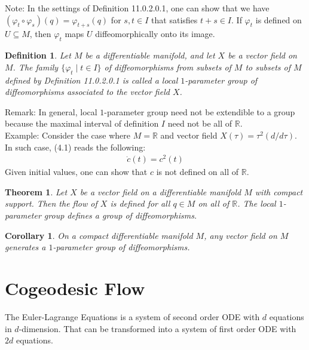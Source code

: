 \documentclass[11pt]{book}
\theoremstyle{break}
\theoremstyle{break}
\newtheorem{thm}{Theorem}[section]
\newtheorem{corT}[lem]{Corollary}
\newtheorem{defn}{Definition}[corL]
\newcommand{\R}{\mathbb{R}}
\newcommand{\note}{\color{red}Note: \color{black}}
\newcommand{\remark}{\color{blue}Remark: \color{black}}
\newcommand{\example}{\color{green}Example: \color{black}}
\begin{document}
\note In the settings of Definition 11.0.2.0.1, one can show that we have $(\varphi_{t}\circ \varphi_s) (q) = \varphi_{t+s}(q)$ for $s,t\in I$ that satisfies $t+s\in I$. If $\varphi_t$ is defined on $U \subseteq M$, then $\varphi_t$ maps $U$ diffeomorphically onto its image. \\

\begin{defn}
Let $M$ be a differentiable manifold, and let $X$ be a vector field on $M$. The family $\{\varphi_t \mid t \in I\}$ of diffeomorphisms from subsets of $M$ to subsets of $M$ defined by Definition 11.0.2.0.1 is called a local $1$-parameter group of diffeomorphisms associated to the vector field $X$.
\end{defn} 

\remark In general, local $1$-parameter group need not be extendible to a group because the maximal interval of definition $I$ need not be all of $\R$. \\

\example Consider the case where $M = \R$ and vector field $X(\tau) = \tau^2 (d/d\tau)$. In such case, (4.1) reads the following:
\begin{align*}
\dot{c}(t) = c^2(t)
\end{align*}
Given initial values, one can show that $c$ is not defined on all of $\R$. 

\begin{thm}
Let $X$ be a vector field on a differentiable manifold $M$ with compact support. Then the flow of $X$ is defined for all $q \in M$ on all of $\R$. The local $1$-parameter group defines a group of diffeomorphisms. 
\end{thm}

\begin{corT}
On a compact differentiable manifold $M$, any vector field on $M$ generates a $1$-parameter group of diffeomorphisms. 
\end{corT}


\newpage
\section[Cogeodesic Flow]{\color{red} Cogeodesic Flow\color{black}}
The Euler-Lagrange Equations is a system of second order ODE with $d$ equations in $d$-dimension. That can be transformed into a system of first order ODE with $2d$ equations. \\
\end{document}
